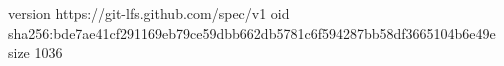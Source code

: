 version https://git-lfs.github.com/spec/v1
oid sha256:bde7ae41cf291169eb79ce59dbb662db5781c6f594287bb58df3665104b6e49e
size 1036
